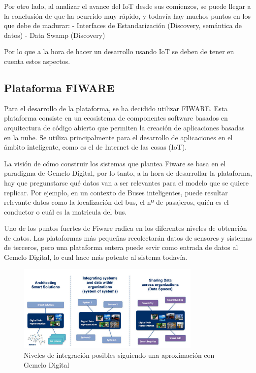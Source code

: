 \documentclass[12pt, a4paper, twoside]{article}
\begin{document}
Por otro lado, al analizar el avance del IoT desde sus comienzos, se puede llegar a la conclusión 
de que ha ocurrido muy rápido, y todavía hay muchos puntos en los que debe de madurar:
- Interfaces de Estandarización (Discovery, semántica de datos)
- Data Swamp (Discovery)

Por lo que a la hora de hacer un desarrollo usando IoT se deben de tener en cuenta estos aspectos.


\subsection{Plataforma FIWARE} 
Para el desarrollo de la plataforma, se ha decidido utilizar FIWARE.
Esta plataforma consiste en un ecosistema de componentes software basados en arquitectura
de código abierto que permiten la creación de aplicaciones basadas en la nube. Se utiliza 
principalmente para el desarrollo de aplicaciones en el ámbito inteligente, como es el de 
Internet de las cosas (IoT).

La visión de cómo construir los sistemas que plantea Fiware se basa en el paradigma de Gemelo Digital,
por lo tanto, a la hora de desarrollar la plataforma, hay que pregunstarse qué datos van a 
ser relevantes para el modelo que se quiere replicar. Por ejemplo, en un contexto de 
Buses inteligentes, puede resultar relevante datos como la localización del bus, 
el nº de pasajeros, quién es el conductor o cuál es la matricula del bus.

Uno de los puntos fuertes de Fiware radica en los diferentes niveles de obtención de datos.
Las plataformas más pequeñas recolectarán datos de sensores y sistemas de terceros,
pero una plataforma entera puede sevir como entrada de datos al Gemelo Digital, lo
cual hace más potente al sistema todavía.

\begin{figure}[h]
  \centering
  \includegraphics[width=0.8\textwidth]{digital_twin_levels_integration.png}
  \caption{Niveles de integración posibles siguiendo una aproximación con Gemelo Digital}
\end{figure}
\end{document}

